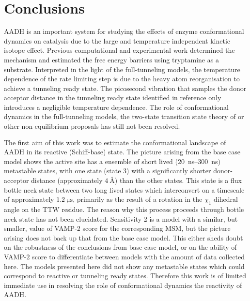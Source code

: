 \section{Conclusions}\label{sec:aadh_conclusions}
AADH is an important system for studying the effects of enzyme conformational dynamics on catalysis due to the large and temperature independent kinetic isotope effect. Previous computational and experimental work determined the mechanism and estimated the free energy barriers using tryptamine as a substrate. Interpreted in the light of the full-tunneling models, the temperature dependence of the rate limiting step is due to the heavy atom reorganisation to achieve a tunneling ready state. The picosecond vibration that samples the donor acceptor distance in the tunneling ready state identified in reference \cite{johannissenProtonTunnelingAromatic2007} only introduces a negligible temperature dependence. The role of conformational dynamics in the full-tunneling models, the two-state transition state theory of \cite{glowackiProteinDynamicsEnzyme2012} or other non-equilibrium proposals has still not been resolved. 

The first aim of this work was to estimate the conformational landscape of AADH in its reactive (Schiff-base) state. The picture arising from the base case model shows the active site has a ensemble of short lived (\SIrange{20}{300}{\nano\second}) metastable states, with one state (state \num{3}) with a significantly shorter donor-acceptor distance (approximately $\SI{4}{\angstrom}$) than the other states. This state is a flux bottle neck state between two long lived states which interconvert on a timescale of approximately $\SI{1.2}{\micro\second}$, primarily as the result of a rotation in the $\chi_1$ dihedral angle on the TTW residue. The reason why this process proceeds through bottle neck state has not been elucidated. Sensitivity 2 is a model with a similar, but smaller, value of VAMP-2 score for the corresponding MSM, but the picture arising does not back up that from the base case model. This either sheds doubt on the robustness of the conclusions from base case model, or on the ability of VAMP-2 score to differentiate between models with the amount of data collected here. The models presented here did not show any metastable states which could correspond to reactive or tunneling ready states. Therefore this work is of limited immediate use in resolving the role of conformational dynamics the reactivity of AADH. 

